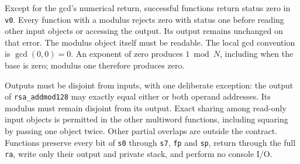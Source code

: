 Except for the gcd's numerical return, successful functions return status zero in
\texttt{v0}. Every function with a modulus rejects zero with status one before reading
other input objects or accessing the output. Its output remains unchanged on that
error. The modulus object itself must be readable. The local gcd convention is
\(\gcd(0,0)=0\). An exponent of zero produces \(1\bmod N\), including when the base
is zero; modulus one therefore produces zero.

Outputs must be disjoint from inputs, with one deliberate exception: the output of
\texttt{rsa\_addmod128} may exactly equal either or both operand addresses. Its modulus
must remain disjoint from its output. Exact sharing among read-only input objects is
permitted in the other multiword functions, including squaring by passing one object
twice. Other partial overlaps are outside the contract. Functions preserve every bit
of \texttt{s0} through \texttt{s7}, \texttt{fp} and \texttt{sp}, return through the full
\texttt{ra}, write only their output and private stack, and perform no console I/O.
